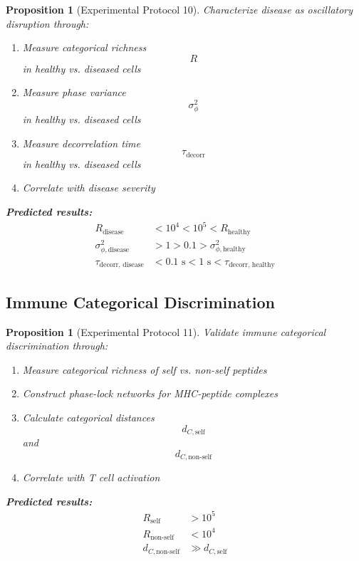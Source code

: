 \documentclass[12pt,a4paper]{article}
\newtheorem{proposition}[theorem]{Proposition}
\begin{document}
\begin{proposition}[Experimental Protocol 10]
Characterize disease as oscillatory disruption through:
\begin{enumerate}
\item Measure categorical richness $$R$$ in healthy vs. diseased cells
\item Measure phase variance $$\sigma_\phi^2$$ in healthy vs. diseased cells
\item Measure decorrelation time $$\tau_{\text{decorr}}$$ in healthy vs. diseased cells
\item Correlate with disease severity
\end{enumerate}

\textbf{Predicted results:}
\begin{align}
R_{\text{disease}} &< 10^4 < 10^5 < R_{\text{healthy}} \\
\sigma_{\phi, \text{disease}}^2 &> 1 > 0.1 > \sigma_{\phi, \text{healthy}}^2 \\
\tau_{\text{decorr, disease}} &< 0.1 \text{ s} < 1 \text{ s} < \tau_{\text{decorr, healthy}}
\end{align}
\end{proposition}

\subsection{Immune Categorical Discrimination}

\begin{proposition}[Experimental Protocol 11]
Validate immune categorical discrimination through:
\begin{enumerate}
\item Measure categorical richness of self vs. non-self peptides
\item Construct phase-lock networks for MHC-peptide complexes
\item Calculate categorical distances $$d_{C, \text{self}}$$ and $$d_{C, \text{non-self}}$$
\item Correlate with T cell activation
\end{enumerate}

\textbf{Predicted results:}
\begin{align}
R_{\text{self}} &> 10^5 \\
R_{\text{non-self}} &< 10^4 \\
d_{C, \text{non-self}} &\gg d_{C, \text{self}}
\end{align}
\end{proposition}
\end{document}
